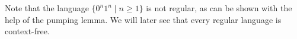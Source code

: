 

\setcounter{section}{5}
\setcounter{subsection}{1}
\setcounter{dfn}{4}


Note that the language $\{0^n1^n \mid n \ge 1\}$ is not regular, as can be shown with the help of the pumping lemma.
We will later see that every regular language is context-free.


